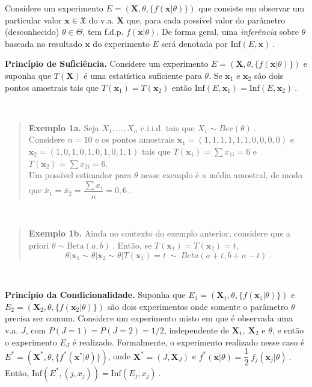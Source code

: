 \documentclass[
]{book}
\begin{document}
Considere um experimento \(E=(\boldsymbol{X},\theta,\{f(\boldsymbol x|\theta)\})\) que consiste em observar um particular valor \(\boldsymbol{x}\in\mathfrak{X}\) do v.a. \(\boldsymbol{X}\) que, para cada possível valor do parâmetro (desconhecido) \(\theta\in\Theta\), tem f.d.p. \(f(\boldsymbol x|\theta)\). De forma geral, uma \emph{inferência} sobre \(\theta\) baseada no resultado \(\boldsymbol x\) do experimento \(E\) será denotada por \(\text{Inf}(E,\boldsymbol x)~.\)

\textbf{Princípio de Suficiência.} Considere um experimento \(E=(\boldsymbol{X},\theta,\{f(\boldsymbol{x}|\theta)\})\) e suponha que \(T(\boldsymbol{X})\) é uma estatística suficiente para \(\theta\). Se \(\boldsymbol x_1\) e \(\boldsymbol x_2\) são dois pontos amostrais tais que \(T(\boldsymbol{x}_1)=T(\boldsymbol{x}_2)\) então \(\text{Inf}(E,\boldsymbol{x}_1)=\text{Inf}(E,\boldsymbol{x}_2)~.\)

\(~\)

\begin{quote}
\textbf{Exemplo 1a.} Seja \(X_1,\ldots,X_{n}\) c.i.i.d. tais que \(X_1\sim Ber(\theta)~.\)\\
Considere \(n=10\) e os pontos amostrais \(\boldsymbol x_1=(1,1,1,1,1,1,0,0,0,0)\) e \(\boldsymbol x_2=(1,0,1,0,1,0,1,0,1,1)\) tais que \(T(\boldsymbol x_1)=\sum x_{1i}=6\) e \(T(\boldsymbol x_2)=\sum x_{2i}=6\).\\
Um possível estimador para \(\theta\) nesse exemplo é a média amostral, de modo que \(\bar{x}_1=\bar{x}_2=\dfrac{\sum x_i}{n}=0,6~.\)
\end{quote}

\(~\)

\begin{quote}
\textbf{Exemplo 1b.} Ainda no contexto do exemplo anterior, considere que a priori \(\theta \sim \text{Beta}(a,b)~.\) Então, se \(T(\boldsymbol x_1)=T(\boldsymbol x_2)=t\),
\[\theta|\boldsymbol x_1\sim\theta|\boldsymbol x_2\sim\theta|T(\boldsymbol  x_1)=t~\sim~ Beta(a+t,b+n-t)~.\]
\end{quote}

\(~\)

\textbf{Princípio da Condicionalidade.} Suponha que \(E_1=\left(\boldsymbol X_1,\theta,\{f(\boldsymbol x_1|\theta)\}\right)\) e \(E_2=\left(\boldsymbol X_2,\theta,\{f(\boldsymbol x_2|\theta)\}\right)\) são dois experimentos onde somente o parâmetro \(\theta\) precisa ser comum. Considere um experimento misto em que é observada uma v.a. \(J\), com \(P(J=1)=P(J=2)=1/2\), independente de \(\boldsymbol X_1,~\boldsymbol X_2\) e \(\theta\), e então o experimento \(E_J\) é realizado. Formalmente, o experimento realizado nesse caso é \(E^*=(\boldsymbol X^*,\theta,\{f^*(\boldsymbol x^*|\theta)\})\), onde \(\boldsymbol X^*=(J,\boldsymbol X_J)\) e \(f^*(\boldsymbol x|\theta)=\dfrac{1}{2}~f_j(\boldsymbol x_j|\theta)~.\) Então, \(\text{Inf}\left(E^*,(j,x_j)\right) = \text{Inf}\left(E_j,x_j\right)~.\)
\end{document}
